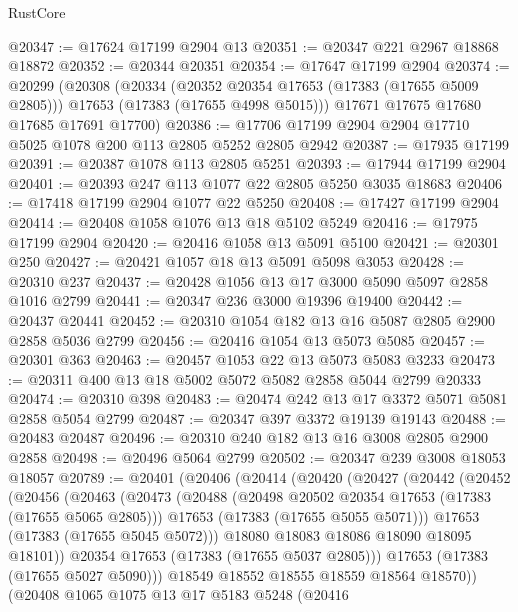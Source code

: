 \begin{lexlean}{RustCore}
\begin{coremodule}
@20347 := @17624 @17199 @2904 @13
@20351 := @20347 @221 @2967 @18868 @18872
@20352 := @20344 @20351
@20354 := @17647 @17199 @2904
@20374 := @20299
    (@20308
      (@20334
        (@20352 @20354 @17653 (@17383 (@17655 @5009 @2805)))
        @17653
        (@17383 (@17655 @4998 @5015)))
      @17671
      @17675
      @17680
      @17685
      @17691
      @17700)
@20386 := @17706 @17199 @2904 @2904 @17710 @5025 @1078 @200 @113 @2805 @5252 @2805 @2942
@20387 := @17935 @17199
@20391 := @20387 @1078 @113 @2805 @5251
@20393 := @17944 @17199 @2904
@20401 := @20393 @247 @113 @1077 @22 @2805 @5250 @3035 @18683
@20406 := @17418 @17199 @2904 @1077 @22 @5250
@20408 := @17427 @17199 @2904
@20414 := @20408 @1058 @1076 @13 @18 @5102 @5249
@20416 := @17975 @17199 @2904
@20420 := @20416 @1058 @13 @5091 @5100
@20421 := @20301 @250
@20427 := @20421 @1057 @18 @13 @5091 @5098 @3053
@20428 := @20310 @237
@20437 := @20428 @1056 @13 @17 @3000 @5090 @5097 @2858 @1016 @2799
@20441 := @20347 @236 @3000 @19396 @19400
@20442 := @20437 @20441
@20452 := @20310 @1054 @182 @13 @16 @5087 @2805 @2900 @2858 @5036 @2799
@20456 := @20416 @1054 @13 @5073 @5085
@20457 := @20301 @363
@20463 := @20457 @1053 @22 @13 @5073 @5083 @3233
@20473 := @20311 @400 @13 @18 @5002 @5072 @5082 @2858 @5044 @2799 @20333
@20474 := @20310 @398
@20483 := @20474 @242 @13 @17 @3372 @5071 @5081 @2858 @5054 @2799
@20487 := @20347 @397 @3372 @19139 @19143
@20488 := @20483 @20487
@20496 := @20310 @240 @182 @13 @16 @3008 @2805 @2900 @2858
@20498 := @20496 @5064 @2799
@20502 := @20347 @239 @3008 @18053 @18057
@20789 := @20401
    (@20406
      (@20414
        (@20420
          (@20427
            (@20442
              (@20452
                (@20456
                  (@20463
                    (@20473
                      (@20488
                        (@20498 @20502 @20354 @17653 (@17383 (@17655 @5065 @2805)))
                        @17653
                        (@17383 (@17655 @5055 @5071)))
                      @17653
                      (@17383 (@17655 @5045 @5072)))
                    @18080
                    @18083
                    @18086
                    @18090
                    @18095
                    @18101))
                @20354
                @17653
                (@17383 (@17655 @5037 @2805)))
              @17653
              (@17383 (@17655 @5027 @5090)))
            @18549
            @18552
            @18555
            @18559
            @18564
            @18570))
        (@20408
          @1065
          @1075
          @13
          @17
          @5183
          @5248
          (@20416

\end{coremodule}
\end{lexlean}

